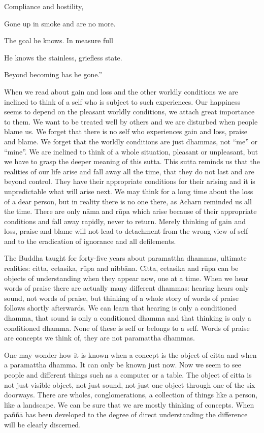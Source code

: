 {{{{{{{{{{Compliance and hostility,

Gone up in smoke and are no more.

The goal he knows. In measure full

He knows the stainless, griefless state.

Beyond becoming has he gone.''

When we read about gain and loss and
the other worldly conditions we are inclined to think of a self who is
subject to such experiences. Our happiness seems to depend on the
pleasant worldly conditions, we attach great importance to them. We want
to be treated well by others and we are disturbed when people blame us.
We forget that there is no self who experiences gain and loss, praise
and blame. We forget that the worldly conditions are just dhammas, not
``me'' or ``mine''. We are inclined to think of a whole situation,
pleasant or unpleasant, but we have to grasp the deeper meaning of this
sutta. This sutta reminds us that the realities of our life arise and
fall away all the time, that they do not last and are beyond control.
They have their appropriate conditions for their arising and it is
unpredictable what will arise next. We may think for a long time about
the loss of a dear person, but in reality there is no one there, as
Acharn reminded us all the time. There are only nāma and rūpa which
arise because of their appropriate conditions and fall away rapidly,
never to return. Merely thinking of gain and loss, praise and blame will
not lead to detachment from the wrong view of self and to the
eradication of ignorance and all defilements. 

The Buddha taught for forty-five years
about paramattha dhammas, ultimate realities: citta, cetasika, rūpa and
nibbāna. Citta, cetasika and rūpa can be objects of understanding when
they appear now, one at a time. When we hear words of praise there are
actually many different dhammas: hearing hears only sound, not words of
praise, but thinking of a whole story of words of praise follows shortly
afterwards. We can learn that hearing is only a conditioned dhamma, that
sound is only a conditioned dhamma and that thinking is only a
conditioned dhamma. None of these is self or belongs to a self. Words of
praise are concepts we think of, they are not paramattha dhammas. 

One may wonder how it is known when a
concept is the object of citta and when a paramattha dhamma. It can only
be known just now. Now we seem to see people and different things such
as a computer or a table. The object of citta is not just visible
object, not just sound, not just one object through one of the six
doorways. There are wholes, conglomerations, a collection of things like
a person, like a landscape. We can be sure that we are mostly thinking
of concepts. When paññā has been developed to the degree of direct
understanding the difference will be clearly discerned. 

}}}}}}}}}}
